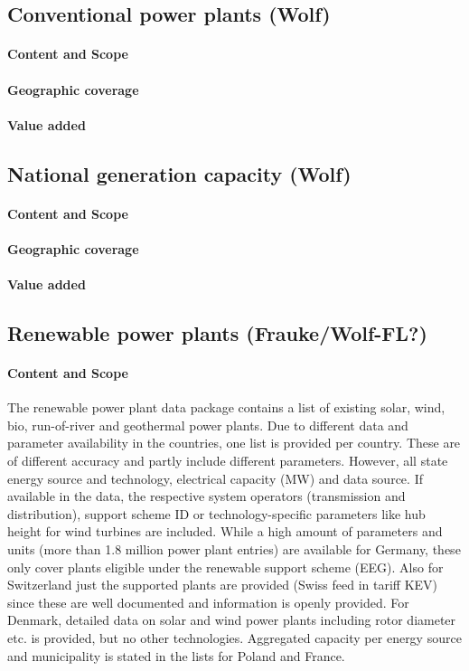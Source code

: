 \documentclass[article]{elsarticle}
\begin{document}
\subsection{Conventional power plants (Wolf)}
\paragraph{Content and Scope}
\paragraph{Geographic coverage}
\paragraph{Value added}

\subsection{National generation capacity (Wolf)}
\paragraph{Content and Scope}
\paragraph{Geographic coverage}
\paragraph{Value added}

\subsection{Renewable power plants (Frauke/Wolf-FL?)}
\paragraph{Content and Scope}
The renewable power plant data package contains a list of existing solar, wind, bio, run-of-river and geothermal power plants. Due to different data and parameter availability in the countries, one list is provided per country. These are of different accuracy and partly include different parameters. However, all state energy source and technology, electrical capacity (MW) and data source. If available in the data, the respective system operators (transmission and distribution), support scheme ID or technology-specific parameters like hub height for wind turbines are included. While a high amount of parameters and units (more than 1.8 million power plant entries) are available for Germany, these only cover plants eligible under the renewable support scheme (EEG). Also for Switzerland just the supported plants are provided (Swiss feed in tariff KEV) since these are well documented and information is openly provided. For Denmark, detailed data on solar and wind power plants including rotor diameter etc. is provided, but no other technologies. Aggregated capacity per energy source and municipality is stated in the lists for Poland and France.
\end{document}
